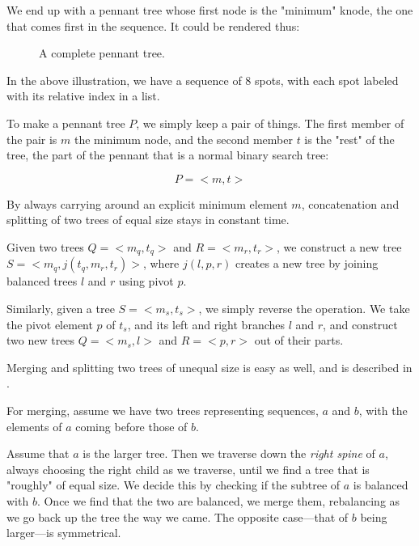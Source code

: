 \documentclass[sigconf]{acmart}
\begin{document}
We end up with a pennant tree whose first node is the "minimum" knode, the one
that comes first in the sequence. It could be rendered thus:

\begin{figure}
    \caption{A complete pennant tree.}
    \label{complete-pennant}
\end{figure}

In the above illustration, we have a sequence of 8 spots, with each spot labeled
with its relative index in a list.

To make a pennant tree $P$, we simply keep a pair of things. The first member of the
pair is $m$ the minimum node, and the second member $t$ is the "rest" of the
tree, the part of the pennant that is a normal binary search tree:

\begin{equation}
    P = <m,t>
\end{equation}

By always carrying around an explicit minimum element $m$, concatenation and
splitting of two trees of equal size stays in constant time.

Given two trees $Q = <m_q,t_q>$ and $R = <m_r,t_r>$, we construct a new tree $S
= <m_q,j(t_q, m_r, t_r)>$, where $j(l,p,r)$ creates a new tree by joining
balanced trees $l$ and $r$ using pivot $p$.

Similarly, given a tree $S = <m_s,t_s>$, we simply reverse the operation. We
take the pivot element $p$ of $t_s$, and its left and right branches $l$ and
$r$, and construct two new trees $Q = <m_s, l>$ and $R = <p, r>$ out of their
parts.

Merging and splitting two trees of unequal size is easy as well, and is described in
\cite{10.1145/3512769}.

For merging, assume we have two trees representing sequences, $a$ and
$b$, with the elements of $a$ coming before those of $b$.

Assume that $a$ is the larger tree. Then we traverse down the \emph{right spine}
of $a$, always choosing the right child as we traverse, until we find a tree
that is "roughly" of equal size. We decide this by checking if the subtree of
$a$ is balanced with $b$. Once we find that the two are balanced, we merge them,
rebalancing as we go back up the tree the way we came. The opposite case---that
of $b$ being larger---is symmetrical.
\end{document}

